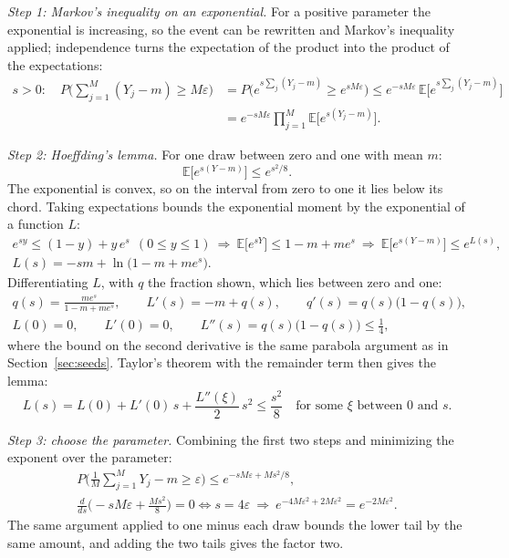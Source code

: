 \documentclass[11pt]{article}
\begin{document}
\emph{Step 1: Markov's inequality on an exponential.} For a positive parameter the exponential is
increasing, so the event can be rewritten and Markov's inequality applied; independence turns the
expectation of the product into the product of the expectations:
\begin{align*}
  s > 0: \quad P\Big(\sum_{j=1}^{M} (Y_j - m) \ge M \varepsilon\Big)
  &= P\Big(e^{s \sum_j (Y_j - m)} \ge e^{s M \varepsilon}\Big)
  \le e^{-s M \varepsilon}\, \mathbb{E}\Big[e^{s \sum_j (Y_j - m)}\Big] \\
  &= e^{-s M \varepsilon} \prod_{j=1}^{M} \mathbb{E}\big[e^{s (Y_j - m)}\big] .
\end{align*}

\emph{Step 2: Hoeffding's lemma.} For one draw between zero and one with mean $m$:
\[
  \mathbb{E}\big[e^{s (Y - m)}\big] \le e^{s^2 / 8} .
\]
The exponential is convex, so on the interval from zero to one it lies below its chord. Taking
expectations bounds the exponential moment by the exponential of a function $L$:
\begin{gather*}
  e^{s y} \le (1 - y) + y\, e^{s} \ \ (0 \le y \le 1)
  \ \Longrightarrow\ \mathbb{E}\big[e^{s Y}\big] \le 1 - m + m e^{s}
  \ \Longrightarrow\ \mathbb{E}\big[e^{s (Y - m)}\big] \le e^{L(s)}, \\
  L(s) = -s m + \ln\big(1 - m + m e^{s}\big) .
\end{gather*}
Differentiating $L$, with $q$ the fraction shown, which lies between zero and one:
\begin{gather*}
  q(s) = \frac{m e^{s}}{1 - m + m e^{s}}, \qquad L'(s) = -m + q(s), \qquad
  q'(s) = q(s)\big(1 - q(s)\big), \\
  L(0) = 0, \qquad L'(0) = 0, \qquad L''(s) = q(s)\big(1 - q(s)\big) \le \frac{1}{4} ,
\end{gather*}
where the bound on the second derivative is the same parabola argument as in
Section~\ref{sec:seeds}. Taylor's theorem with the remainder term then gives the lemma:
\[
  L(s) = L(0) + L'(0)\, s + \frac{L''(\xi)}{2}\, s^2 \le \frac{s^2}{8}
  \quad \text{for some } \xi \text{ between } 0 \text{ and } s .
\]

\emph{Step 3: choose the parameter.} Combining the first two steps and minimizing the exponent over
the parameter:
\begin{gather*}
  P\Big(\frac{1}{M} \sum_{j=1}^{M} Y_j - m \ge \varepsilon\Big) \le e^{-s M \varepsilon + M s^2 / 8}, \\
  \frac{d}{ds}\Big(-s M \varepsilon + \frac{M s^2}{8}\Big) = 0 \iff s = 4 \varepsilon
  \ \Longrightarrow\ e^{-4 M \varepsilon^2 + 2 M \varepsilon^2} = e^{-2 M \varepsilon^2} .
\end{gather*}
The same argument applied to one minus each draw bounds the lower tail by the same amount, and adding
the two tails gives the factor two.
\end{document}
